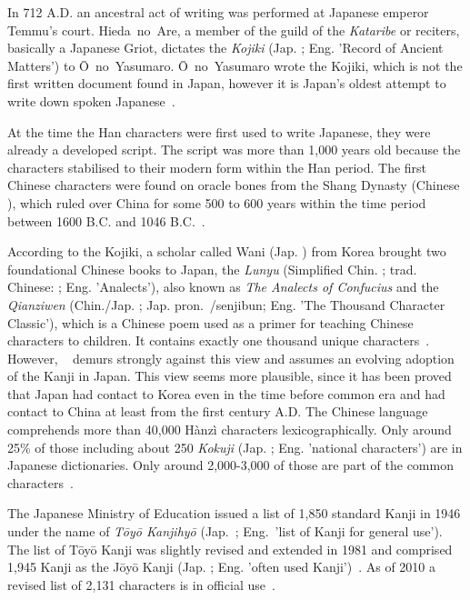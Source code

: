 In 712 A.D. an ancestral act of writing was performed at 
Japanese emperor Temmu's court. Hieda~no~Are, a member of the guild of the 
\emph{Kataribe} or reciters, basically a Japanese Griot, dictates the 
\emph{Kojiki} (Jap. ; Eng. 'Record of Ancient Matters') to 
Ō~no~Yasumaro. Ō~no~Yasumaro wrote the Kojiki, which is not the first written 
document found in Japan, however it is Japan's oldest attempt to write down 
spoken Japanese~.

At the time the Han characters were first used to write Japanese, 
they were already a developed script. The script was more than 1,000 years old
because the characters stabilised to their modern form within the Han 
period. %
The first Chinese characters were found on oracle bones from the Shang Dynasty
(Chinese ), which ruled over China for some 500 to 600 years within 
the time period between 1600 B.C. and 1046 
B.C.~.

According to the Kojiki, a scholar called Wani (Jap. ) from Korea 
brought two foundational Chinese books to Japan, the \emph{Lunyu} 
(Simplified Chin. ; trad. Chinese: ; Eng. 'Analects'), 
also known as \emph{The Analects of Confucius} and 
the \emph{Qianziwen} (Chin./Jap. ; Jap. 
pron.~/senjibun; Eng. 'The Thousand Character Classic'),
which is a Chinese poem used as a primer for teaching Chinese characters to 
children. It contains exactly one thousand unique 
characters~. However, 
~\citeyear{Lange1922} demurs strongly against this view 
and assumes an evolving adoption of the Kanji in
Japan. This view seems more plausible, since it has been proved that Japan 
had contact to Korea even in the time before common era and had contact to 
China at least from the first century A.D. The Chinese language comprehends more
than 40,000 Hànzì characters lexicographically. Only around 25\% of those 
including about 250 \emph{Kokuji} (Jap. ; Eng. 'national characters') 
are in Japanese dictionaries. Only around 2,000-3,000 of those are part of the 
common characters~. 

The Japanese Ministry of Education issued a list of 1,850 standard Kanji in 1946
under the name of \emph{Tōyō Kanjihyō} (Jap.~;
Eng.~'list of Kanji for general use'). The list of Tōyō Kanji was slightly 
revised and extended in 1981 and comprised 1,945 Kanji as the Jōyō Kanji
(Jap. ; Eng. 'often used Kanji')~.
As of 2010 a revised list of 2,131 characters is in official 
use~. 

